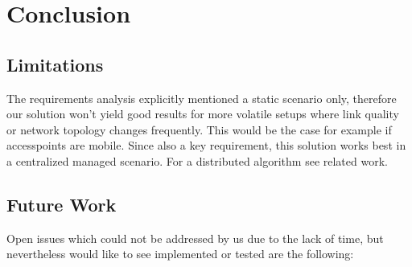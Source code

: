 \chapter{Conclusion}
  
  \section{Limitations}
    The requirements analysis explicitly mentioned a static scenario only, therefore our solution won't yield good 
    results for more volatile setups where link quality or network topology
    changes frequently. This would be the case for example if accesspoints are mobile.
    Since also a key requirement, this solution works best in a centralized managed scenario. 
    For a distributed algorithm see related work.
  \section{Future Work}
    Open issues which could not be addressed by us due to the lack of time, but nevertheless would like 
    to see implemented or tested are the following:
